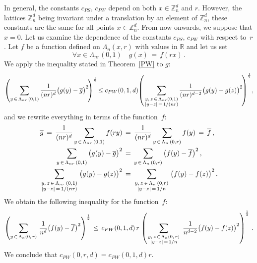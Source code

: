 \documentclass[AHL, Unicode, longabstracts, published]{cedram}
\newcommand{\tatop}[2]{\genfrac{}{}{0pt}{1}{#1}{#2}}
\newcommand*\Znd {{\mathbb Z_n^d}}
\newcommand*\R{\mathbb{R}}
\newcommand*\baf {{\overline f}}
\newcommand*\bag {{\overline g}}
\newcommand*\La {{\Lambda}}
\let\oldforall\forall
\renewcommand*{\forall}{\mathrel{\oldforall}}
\begin{document}
In general, the constants $c_{PS}$, $c_{PW}$ depend on both $x\in\Znd$ and $r$. However, the lattices $\Znd$ being invariant under a translation by an element of $\Znd$, these constants are the same for all points $x\in\Znd$. From now onwards, we suppose that $x=0$. Let us examine the dependence of the constants $c_{PS}$, $c_{PW}$ with respect to~$r$. Let $f$ be a function defined on $\La_n(x,r)$ with values in $\R$ and let us set
\[
\forall x\in\La_{nr}(0,1)\quad g(x)\,=\,f(rx)\,.
\]
We apply the inequality stated in Theorem~\ref{PW} to $g$:
\[
\left(\sum_{y\,\in\,\Lambda_{nr}\,(0,1)}\frac{1}{(nr)^d}\big(g(y)-\bag\big)^{2}\!\right)^{\frac{1}{2}}\!
\leq c_{PW}(0,1,d)\!\left(
\sum_{\tatop{y,\,z\,\in\,\Lambda_{nr}(0,1)}{|y-z|\,=\,1/(nr)}}\!
\frac{1}{(nr)^{d-2}}\big(g(y)-g(z)\big)^{2}\!\right)^{\frac{1}{2}}\!,
\]
and we rewrite everything in terms of the function~$f$:
\begin{align*}
\bag\,=\,
\frac{1}{(nr)^d}
\sum_{y\,\in\,\Lambda_{nr}\,(0,1)} f(ry)\,&=\,
\frac{1}{(nr)^d}
\sum_{y\,\in\,\Lambda_{n}\,(0,r)} f(y)\,=\,\baf\,,
\\
\sum_{y\,\in\,\Lambda_{nr}\,(0,1)}\big(g(y)-\bag\big)^{2}\,&=\,
\sum_{y\,\in\,\Lambda_{n}\,(0,r)}\big(f(y)-\baf\big)^{2}\,,
\\
\sum_{\tatop{y,\,z\,\in\,\Lambda_{nr}\,(0,1)}{|y-z|\,=\,1/(nr)}}
\big(g(y)-g(z)\big)^{2}\,&=\,
\sum_{\tatop{y,\,z\,\in\,\Lambda_{n}\,(0,r)}{|y-z|\,=\,1/n}}
\big(f(y)-f(z)\big)^{2}\,.
\end{align*}
We obtain the following inequality for the function~$f$:
\[
\left(\sum_{y\,\in\,\Lambda_{n}(0,\,r)}\,\frac{1}{n^d}\big(f(y)-\baf\big)^{2}\right)^{\frac{1}{2}}
\,\leq\, c_{PW}(0,1,d)\,r\,\left(
\sum_{\tatop{y,\,z\,\in\,\Lambda_{n}(0,\,r)}{|y-z|\,=\,1/n}}\,
\frac{1}{n^{d-2}}\big(f(y)-f(z)\big)^{2}\right)^{\frac{1}{2}}\,.
\]
We conclude that $c_{PW}(0,r,d)= c_{PW}(0,1,d)r$.


\addtocounter{section}{2}
\end{document}
